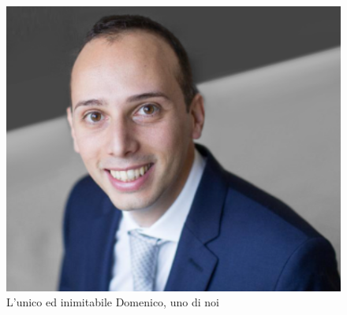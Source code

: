 \begin{figure}[h!]
    \centering
    \includegraphics[scale=1.5]{images/king.png}
    \caption{L'unico ed inimitabile Domenico, uno di noi}
    \label{fig:king}
\end{figure}
\clearpage